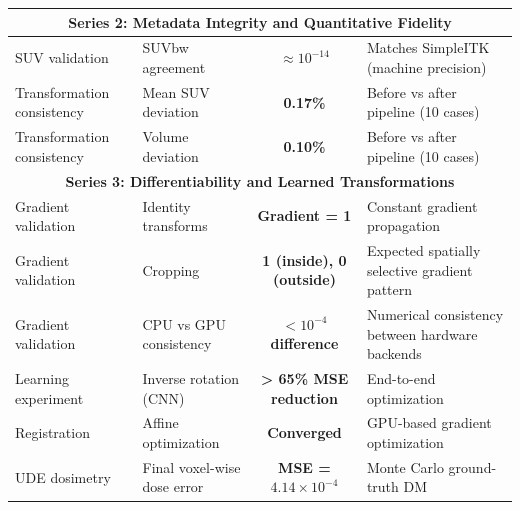 \documentclass[10pt,letterpaper]{article}
\begin{document}
\begin{table}[H]
\begin{tabularx}{\textwidth}{|l|>{\raggedright\arraybackslash}X|c|>{\raggedright\arraybackslash}X|}
\multicolumn{4}{|c|}{\textbf{Series 2: Metadata Integrity and Quantitative Fidelity}} \\
\hline
SUV validation & SUVbw agreement & \textbf{$\approx 10^{-14}$} & Matches SimpleITK (machine precision) \\
Transformation consistency & Mean SUV deviation & \textbf{0.17\%} & Before vs after pipeline (10 cases) \\
Transformation consistency & Volume deviation & \textbf{0.10\%} & Before vs after pipeline (10 cases) \\
\hline
\multicolumn{4}{|c|}{\textbf{Series 3: Differentiability and Learned Transformations}} \\
\hline
Gradient validation & Identity transforms & \textbf{Gradient = 1} & Constant gradient propagation \\
Gradient validation & Cropping & \textbf{1 (inside), 0 (outside)} & Expected spatially selective gradient pattern\\
Gradient validation & CPU vs GPU consistency & \textbf{$< 10^{-4}$ difference} & Numerical consistency between hardware backends\\
Learning experiment & Inverse rotation (CNN) & \textbf{> 65\% MSE reduction} & End-to-end optimization\\
Registration & Affine optimization & \textbf{Converged} & GPU-based gradient optimization \\
UDE dosimetry& Final voxel-wise dose error & \textbf{MSE = $4.14 \times 10^{-4}$} & Monte Carlo ground-truth DM\\
\hline
\end{tabularx}
\end{table}




\end{document}
